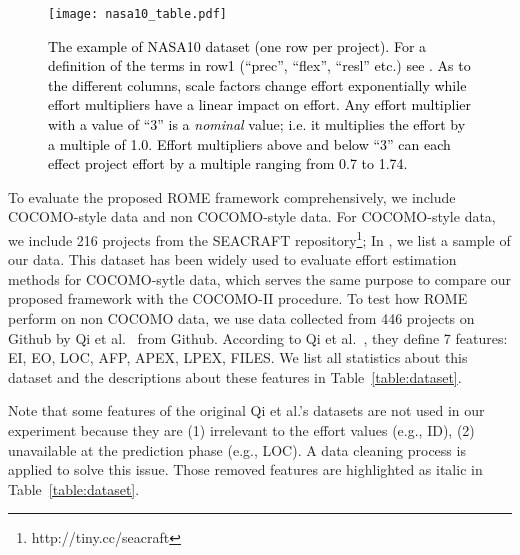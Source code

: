 \begin{figure}
\centerline{\texttt{[image: nasa10\_table.pdf]}}
\caption{\textcolor{black}{ The example of NASA10 dataset (one row per project). For a definition of the terms in row1 (``prec'', ``flex'', ``resl'' etc.) see .
    As to the different columns, scale factors change effort exponentially while effort multipliers have a linear impact on effort.
    Any effort multiplier with a value of ``3'' is a {\em nominal} value; i.e. it multiplies the effort by a multiple of 1.0. Effort multipliers
    above and below ``3'' can each effect project effort by a multiple ranging from 0.7 to 1.74.  
    }}\label{fig:nasa10}
\end{figure}



To evaluate the proposed ROME framework comprehensively, we include COCOMO-style data and non COCOMO-style data. For COCOMO-style data, we include 216 projects from the SEACRAFT repository\footnote{http://tiny.cc/seacraft}; In , we list a sample of our data. This dataset has been widely used to evaluate effort estimation methods for COCOMO-sytle data, which serves the same purpose to compare our proposed framework with the COCOMO-II procedure. 
To test how ROME perform on non COCOMO data, we use data  collected from  446 projects on Github by Qi et al.~\cite{qi2017software} from Github. 
According to Qi et al.~\cite{qi2017software}, they define 7 features: EI, EO, LOC, AFP, APEX, LPEX, FILES. We list all statistics about this dataset and the descriptions about these features in Table~\ref{table:dataset}. 

Note that some features of the original Qi et al.'s datasets are not used in our experiment because they are (1) irrelevant to the effort values (e.g., ID), (2) unavailable at the prediction phase (e.g., LOC). A data cleaning process is applied to solve this issue. 
Those removed features are highlighted as italic in Table~\ref{table:dataset}.





